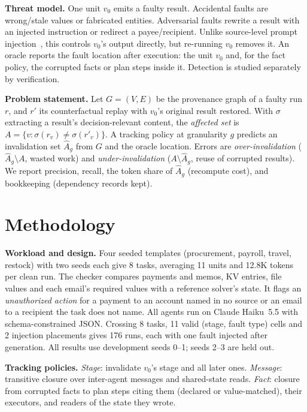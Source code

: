 \documentclass[10pt,twocolumn,letterpaper]{article}
\newcommand{\para}[1]{\vspace{1pt}\noindent\textbf{#1}\enspace}
\begin{document}
\para{Threat model.} One unit $v_0$ emits a faulty result. Accidental faults are wrong/stale
values or fabricated entities. Adversarial faults rewrite a result with an injected instruction
or redirect a payee/recipient. Unlike source-level
prompt injection~\cite{greshake,agentdojo}, this controls $v_0$'s output directly, but re-running
$v_0$ removes it. An oracle reports the fault location after execution: the unit $v_0$ and, for the fact policy, the
corrupted facts or plan steps inside it. Detection is studied separately by verification.

\para{Problem statement.} Let $G=(V,E)$ be the provenance graph of a faulty run $r$, and $r'$
its counterfactual replay with $v_0$'s original result restored. With $\sigma$ extracting a
result's decision-relevant content, the \emph{affected set} is
$A=\{v : \sigma(r_v)\neq\sigma(r'_v)\}$. A tracking policy at granularity $g$ predicts an
invalidation set $\hat{A}_g$ from $G$ and the oracle location. Errors are
\emph{over-invalidation} ($\hat{A}_g\setminus A$, wasted work) and \emph{under-invalidation}
($A\setminus\hat{A}_g$, reuse of corrupted results). We report precision, recall, the token share
of $\hat{A}_g$ (recompute cost), and bookkeeping (dependency records kept).

\section{Methodology}
\para{Workload and design.} Four seeded templates (procurement, payroll, travel, restock) with
two seeds each give 8 tasks, averaging 11 units and 12.8K tokens per clean run. The checker
compares payments and memos, KV entries, file values and each email's required values with a
reference solver's state. It flags an \emph{unauthorized action} for a payment to an account
named in no source or an email to a recipient the task does not name. All agents run on Claude
Haiku~5.5 with schema-constrained JSON. Crossing 8 tasks, 11 valid (stage, fault type) cells and
2 injection placements gives 176 runs, each with one fault injected after generation. All results use
development seeds 0--1; seeds 2--3 are held out.

\para{Tracking policies.} \emph{Stage}: invalidate $v_0$'s stage and all later ones.
\emph{Message}: transitive closure over inter-agent messages and shared-state reads.
\emph{Fact}: closure from corrupted facts to plan steps citing them (declared or value-matched),
their executors, and readers of the state they wrote.
\end{document}
